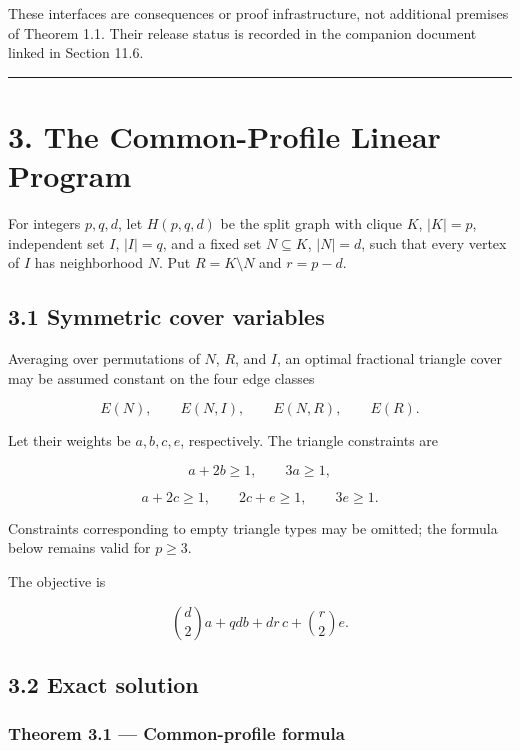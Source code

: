 \documentclass[english,11pt,a4paper]{article}
\begin{document}
These interfaces are consequences or proof infrastructure, not
additional premises of Theorem 1.1. Their release status is recorded in
the companion document linked in Section 11.6.

\begin{center}\rule{0.5\linewidth}{0.5pt}\end{center}

\section{3. The Common-Profile Linear
Program}\label{the-common-profile-linear-program}

For integers \(p,q,d\), let \(H(p,q,d)\) be the split graph with clique
\(K\), \(|K|=p\), independent set \(I\), \(|I|=q\), and a fixed set
\(N\subseteq K\), \(|N|=d\), such that every vertex of \(I\) has
neighborhood \(N\). Put \(R=K\setminus N\) and \(r=p-d\).

\subsection{3.1 Symmetric cover
variables}\label{symmetric-cover-variables}

Averaging over permutations of \(N\), \(R\), and \(I\), an optimal
fractional triangle cover may be assumed constant on the four edge
classes

\[
E(N),
\qquad E(N,I),
\qquad E(N,R),
\qquad E(R).
\]

Let their weights be \(a,b,c,e\), respectively. The triangle constraints
are

\[
a+2b\ge1,
\qquad
3a\ge1,
\tag{3.1}
\]

\[
a+2c\ge1,
\qquad
2c+e\ge1,
\qquad
3e\ge1.
\tag{3.2}
\]

Constraints corresponding to empty triangle types may be omitted; the
formula below remains valid for \(p\ge3\).

The objective is

\[
\binom d2a+qdb+dr\,c+\binom r2e.
\tag{3.3}
\]

\subsection{3.2 Exact solution}\label{exact-solution}

\subsubsection{Theorem 3.1 --- Common-profile
formula}\label{theorem-3.1-common-profile-formula}
\end{document}
